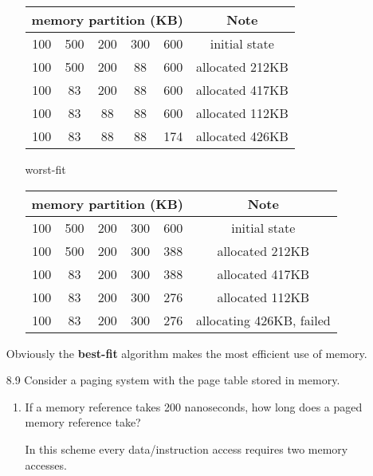\begin{enumerate}
\begin{enumerate}
        \begin{tabular}{|c|c|c|c|c|c|}
        \hline
        \multicolumn{5}{|c|}{memory partition (KB)} & Note\\
        \hline
        100 & 500 & 200 & 300 & 600 & initial state \\
        \hline
        100 & 500 & 200 & 88 & 600 & allocated 212KB \\
        \hline
        100 & 83 & 200 & 88 & 600 & allocated 417KB \\
        \hline
        100 & 83 & 88 & 88 & 600 & allocated 112KB \\
        \hline
        100 & 83 & 88 & 88 & 174 & allocated 426KB \\        
        \hline
        \end{tabular}
        
        \item [worst-fit]
        
        \begin{tabular}{|c|c|c|c|c|c|}
        \hline
        \multicolumn{5}{|c|}{memory partition (KB)} & Note \\
        \hline
        100 & 500 & 200 & 300 & 600 & initial state \\
        \hline
        100 & 500 & 200 & 300 & 388 & allocated 212KB \\
        \hline
        100 & 83 & 200 & 300 & 388 & allocated 417KB \\
        \hline
        100 & 83 & 200 & 300 & 276 & allocated 112KB \\
        \hline
        100 & 83 & 200 & 300 & 276 & allocating 426KB, failed \\        
        \hline
        \end{tabular}
            
    \end{enumerate}
    
    Obviously the \textbf{best-fit} algorithm makes the most efficient use of memory.
    
    \item [8.9] Consider a paging system with the page table stored in memory.
    
    \begin{enumerate}
        \item If a memory reference takes 200 nanoseconds, how long does a paged memory reference take?
        
        In this scheme every data/instruction access requires two memory accesses.
        

\end{enumerate}
\end{enumerate}
